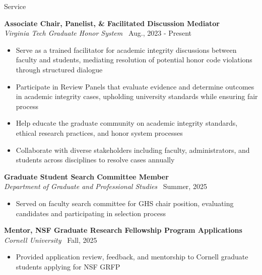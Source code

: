 \documentclass{resume}
\begin{document}
\begin{rSection}{Service}

{\bf Associate Chair, Panelist, \& Facilitated Discussion Mediator}\\
\emph{Virginia Tech Graduate Honor System} \hfill {\ Aug., 2023 - Present}
\begin{itemize}
    \item \vspace{-0.5em} Serve as a trained facilitator for academic integrity discussions between faculty and students, mediating resolution of potential honor code violations through structured dialogue \vspace{-0.3em}
    \item  \vspace{-0.5em} Participate in Review Panels that evaluate evidence and determine outcomes in academic integrity cases, upholding university standards while ensuring fair process \vspace{-0.3em}
    \item  \vspace{-0.5em} Help educate the graduate community on academic integrity standards, ethical research practices, and honor system processes \vspace{-0.3em}
    \item  \vspace{-0.5em} Collaborate with diverse stakeholders including faculty, administrators, and students across disciplines to resolve cases annually \vspace{-0.3em}
\end{itemize} 

{\bf Graduate Student Search Committee Member}\\
\emph{Department of Graduate and Professional Studies} \hfill {\ Summer, 2025}
\begin{itemize}
    \item[] \vspace{-0.5em} \hspace{-1em} Served on faculty search committee for GHS chair position, evaluating candidates and participating in selection process
\end{itemize}

{\bf Mentor, NSF Graduate Research Fellowship Program Applications}\\
\emph{Cornell University} \hfill {\ Fall, 2025}
\begin{itemize}
    \item[] \vspace{-0.5em} \hspace{-1em} Provided application review, feedback, and mentorship to Cornell graduate students applying for NSF GRFP
\end{itemize}


\end{rSection}
\end{document}

